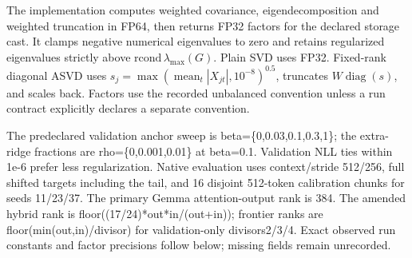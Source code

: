 \documentclass[10pt]{article}
\begin{document}
The implementation computes weighted covariance, eigendecomposition and weighted truncation in FP64, then returns FP32 factors for the declared storage cast. It clamps negative numerical eigenvalues to zero and retains regularized eigenvalues strictly above $\mathrm{rcond}\,\lambda_{\max}(G)$. Plain SVD uses FP32. Fixed-rank diagonal ASVD uses $s_j=\max(\operatorname{mean}_t|X_{jt}|,10^{-8})^{0.5}$, truncates $W\operatorname{diag}(s)$, and scales back. Factors use the recorded unbalanced convention unless a run contract explicitly declares a separate convention.

The predeclared validation anchor sweep is beta=\{0,0.03,0.1,0.3,1\}; the extra-ridge fractions are rho=\{0,0.001,0.01\} at beta=0.1. Validation NLL ties within 1e-6 prefer less regularization. Native evaluation uses context/stride 512/256, full shifted targets including the tail, and 16 disjoint 512-token calibration chunks for seeds 11/23/37. The primary Gemma attention-output rank is 384. The amended hybrid rank is floor((17/24)*out*in/(out+in)); frontier ranks are floor(min(out,in)/divisor) for validation-only divisors2/3/4. Exact observed run constants and factor precisions follow below; missing fields remain unrecorded.
\end{document}
